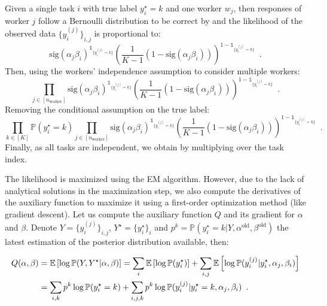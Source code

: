 \begin{constructionbox}
Given a single task $i$ with true label $y_i^\star=k$ and one worker $w_j$, then responses of worker $j$ follow a Bernoulli distribution to be correct by  and the likelihood of the observed data $\{y_i^{(j)}\}_{i,j}$ is proportional to:
\begin{equation*}
    \mathrm{sig}(\alpha_j\beta_i)^{\mathds{1}_{\{y_i^{(j)}=k\}}}\left(\frac{1}{K-1}\left(1-\mathrm{sig}(\alpha_j\beta_i)\right)\right)^{1-\mathds{1}_{\{y_i^{(j)}=k\}}}\enspace.
\end{equation*}
Then, using the workers' independence assumption to consider multiple workers:
\begin{equation*}
    \prod_{j\in [n_{\text{worker}}]}   \mathrm{sig}(\alpha_j\beta_i)^{\mathds{1}_{\{y_i^{(j)}=k\}}}\left(\frac{1}{K-1}\left(1-\mathrm{sig}(\alpha_j\beta_i)\right)\right)^{1-\mathds{1}_{\{y_i^{(j)}=k\}}} \enspace.
\end{equation*}
Removing the conditional assumption on the true label:
\begin{equation*}
    \prod_{k\in[K]}\mathbb{P}(y_i^\star=k)\prod_{j\in [n_{\text{worker}}]} \mathrm{sig}(\alpha_j\beta_i)^{\mathds{1}_{\{y_i^{(j)}=k\}}}\left(\frac{1}{K-1}\left(1-\mathrm{sig}(\alpha_j\beta_i)\right)\right)^{1-\mathds{1}_{\{y_i^{(j)}=k\}}} \enspace.
\end{equation*}
Finally, as all tasks are independent, we obtain  by multiplying over the task index.
\end{constructionbox}

The likelihood is maximized using the EM algorithm.
However, due to the lack of analytical solutions in the maximization step, we also compute the derivatives of the auxiliary function to maximize it using a first-order optimization method (like gradient descent).
Let us compute the auxiliary function $Q$ and its gradient for $\alpha$ and $\beta$. Denote $Y=\{y_i^{(j)}\}_{i,j}$, $Y^\star=\{y_i^\star\}_i$ and $p^k=\mathbb{P}(y_i^\star=k|Y,\alpha^\text{old},\beta^\text{old})$ the latest estimation of the posterior distribution available, then:

\begin{align}
    \label{eq:auxi_glad}
    Q(\alpha,\beta) &=  \mathbb{E}\left[\log \mathbb{P}(Y,Y^\star|\alpha,\beta)\right] = \sum_i \mathbb{E}\left[\log \mathbb{P}(y_i^\star)\right] + \sum_{i,j}\mathbb{E}\left[\log \mathbb{P}(y_i^{(j)}|y_i^\star,\alpha_j,\beta_i)\right] \notag\\
    &=\sum_{i,k} p^k\log \mathbb{P}(y_i^\star=k) + \sum_{i,j,k} p^k \log \mathbb{P}(y_i^{(j)}|y_i^\star=k,\alpha_j,\beta_i) \enspace.
\end{align}


